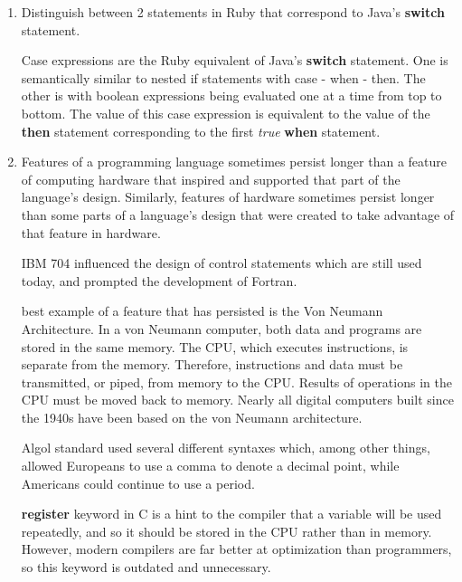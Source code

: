 \begin{enumerate}
\begin{answer}
\end{answer}

  \item Distinguish between 2 statements in Ruby
    that correspond to Java's \textbf{switch} statement.
    
\begin{answer}

    Case expressions are the Ruby equivalent of Java's \textbf{switch} statement. One is semantically similar to nested if statements with case - when - then. The other is with boolean expressions being evaluated one at a time from top to bottom. The value of this case expression is equivalent to the value of the \textbf{then} statement corresponding to the first \textit{true} \textbf{when} statement. 
    
\end{answer}

  \item Features of a programming language sometimes persist
    longer than a feature of computing hardware that inspired
    and supported that part of the language's design.
    Similarly, features of hardware sometimes persist longer
    than some parts of a language's design that were created
    to take advantage of that feature in hardware.
  
\begin{answer}

    \begin{enumerate}
        \The IBM 704 influenced the design of control statements which are still used today, and prompted the development of Fortran. 
    
	   \The best example of a feature that has persisted is the Von Neumann Architecture. In a von Neumann computer, both data and programs are stored in the same memory. The CPU, which executes instructions, is separate from the memory. Therefore, instructions and data must be transmitted, or piped, from memory to the CPU. Results of operations in the CPU must be moved back to memory. Nearly all digital computers built since the 1940s have been based on the von Neumann architecture.
    
        \The Algol standard used several different syntaxes which, among other things, allowed Europeans to use a comma to denote a decimal point, while Americans could continue to use a period.

        \The \textbf{register} keyword in C is a hint to the compiler that a variable will be used repeatedly, and so it should be stored in the CPU rather than in memory. However, modern compilers are far better at optimization than programmers, so this keyword is outdated and unnecessary.
        

\end{enumerate}
\end{answer}
\end{enumerate}
